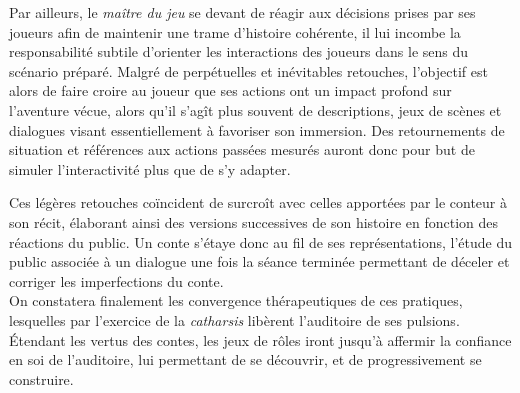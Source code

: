 Par ailleurs, le \textit{maître du jeu} se devant de réagir aux décisions prises par ses joueurs afin de maintenir une trame d'histoire cohérente, il lui incombe la responsabilité subtile d'orienter les interactions des joueurs dans le sens du scénario préparé. Malgré de perpétuelles et inévitables retouches, l'objectif est alors de faire croire au joueur que ses actions ont un impact profond sur l'aventure vécue, alors qu'il s'agît plus souvent de descriptions, jeux de scènes et dialogues visant essentiellement à favoriser son immersion. Des retournements de situation et références aux actions passées mesurés auront donc pour but de simuler l'interactivité plus que de s'y adapter.

Ces légères retouches coïncident de surcroît avec celles apportées par le conteur à son récit, élaborant ainsi des versions successives de son histoire en fonction des réactions du public. Un conte s'étaye donc au fil de ses représentations, l'étude du public associée à un dialogue une fois la séance terminée permettant de déceler et corriger les imperfections du conte.\\


On constatera finalement les convergence thérapeutiques de ces pratiques, lesquelles par l'exercice de la \textit{catharsis} libèrent l'auditoire de ses pulsions. Étendant les vertus des contes, les jeux de rôles iront jusqu'à affermir la confiance en soi de l'auditoire, lui permettant de se découvrir, et de progressivement se construire.

\clearpage
